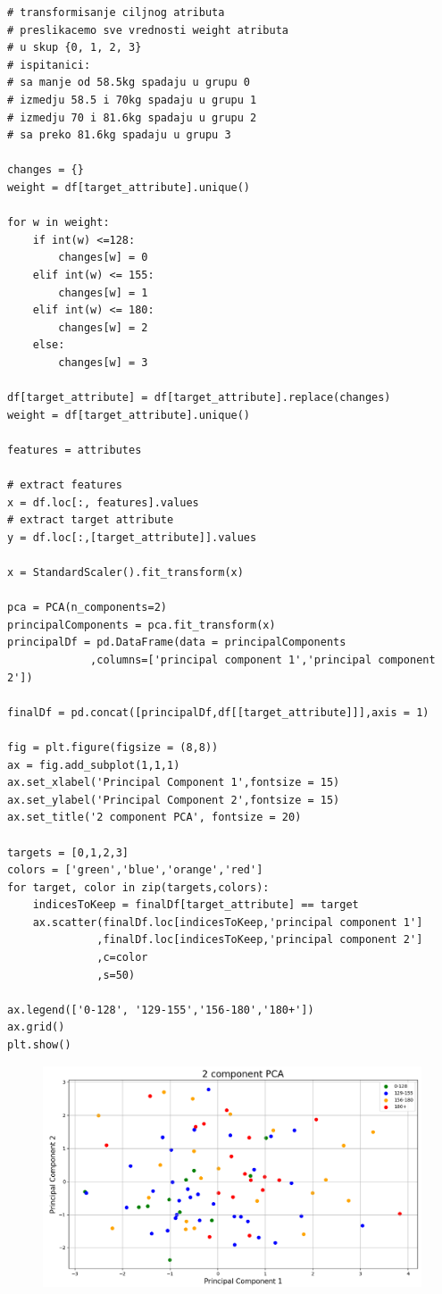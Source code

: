 \documentclass[12pt,a4paper]{article}
\begin{document}
\begin{lstlisting}
# transformisanje ciljnog atributa
# preslikacemo sve vrednosti weight atributa
# u skup {0, 1, 2, 3}
# ispitanici:
# sa manje od 58.5kg spadaju u grupu 0
# izmedju 58.5 i 70kg spadaju u grupu 1
# izmedju 70 i 81.6kg spadaju u grupu 2
# sa preko 81.6kg spadaju u grupu 3

changes = {}
weight = df[target_attribute].unique()

for w in weight:
    if int(w) <=128:
        changes[w] = 0
    elif int(w) <= 155:
        changes[w] = 1
    elif int(w) <= 180:
        changes[w] = 2
    else:
        changes[w] = 3

df[target_attribute] = df[target_attribute].replace(changes)
weight = df[target_attribute].unique()

features = attributes 

# extract features
x = df.loc[:, features].values
# extract target attribute
y = df.loc[:,[target_attribute]].values

x = StandardScaler().fit_transform(x)

pca = PCA(n_components=2)
principalComponents = pca.fit_transform(x)
principalDf = pd.DataFrame(data = principalComponents
             ,columns=['principal component 1','principal component 2'])

finalDf = pd.concat([principalDf,df[[target_attribute]]],axis = 1)

fig = plt.figure(figsize = (8,8))
ax = fig.add_subplot(1,1,1) 
ax.set_xlabel('Principal Component 1',fontsize = 15)
ax.set_ylabel('Principal Component 2',fontsize = 15)
ax.set_title('2 component PCA', fontsize = 20)

targets = [0,1,2,3]
colors = ['green','blue','orange','red']
for target, color in zip(targets,colors):
    indicesToKeep = finalDf[target_attribute] == target
    ax.scatter(finalDf.loc[indicesToKeep,'principal component 1']
              ,finalDf.loc[indicesToKeep,'principal component 2']
              ,c=color
              ,s=50)

ax.legend(['0-128', '129-155','156-180','180+'])
ax.grid()
plt.show()
\end{lstlisting}

\begin{figure}[H]
  \centering
  \includegraphics[width=15cm]{pca.png}
\end{figure}
\end{document}
